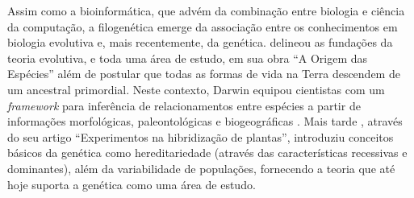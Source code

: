 \documentclass[english,brazilian]{UNISINOSmonografia} %
\begin{document}
%
%


Assim como a bioinformática, que advém da combinação entre biologia e ciência da computação, a filogenética emerge da associação entre os conhecimentos em biologia evolutiva e, mais recentemente, da genética.
 delineou as fundações da teoria evolutiva, e toda uma área de estudo, em sua obra ``A Origem das Espécies'' além de postular que todas as formas de vida na Terra descendem de um ancestral primordial.
Neste contexto, Darwin equipou cientistas com um \textit{framework} para inferência de relacionamentos entre espécies a partir de informações morfológicas, paleontológicas e biogeográficas \cite{Keane2006a}.
Mais tarde , através do seu artigo ``Experimentos na hibridização de plantas'', introduziu conceitos básicos da genética como hereditariedade (através das características recessivas e dominantes), além da variabilidade de populações, fornecendo a teoria que até hoje suporta a genética como uma área de estudo.




\end{document}
